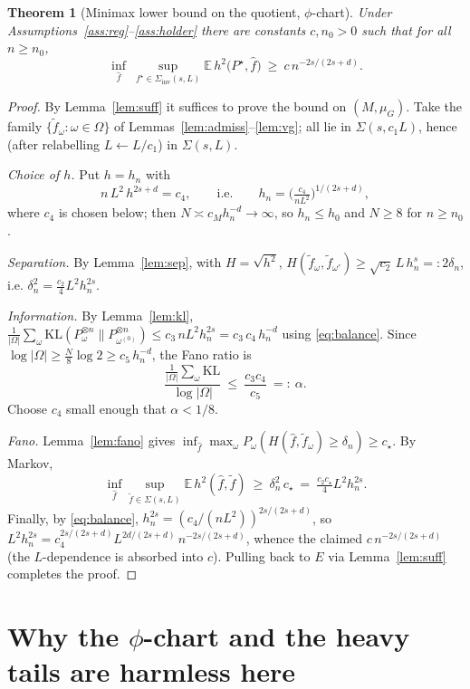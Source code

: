 \documentclass[11pt]{article}
\theoremstyle{plain}
\newtheorem{theorem}{Theorem}[section]
\theoremstyle{definition}
\theoremstyle{remark}
\newcommand{\E}{\mathbb{E}}
\newcommand{\KL}{\mathrm{KL}}
\begin{document}
\begin{theorem}[Minimax lower bound on the quotient, $\phi$-chart]\label{thm:lower}
Under Assumptions~\ref{ass:reg}--\ref{ass:holder} there are constants
$c,n_0>0$ such that for all $n\ge n_0$,
\[
\inf_{\widehat f}\ \sup_{f^\star\in\Sigma_{\mathrm{inv}}(s,L)}
\E\,h^2\big(P^\star,\widehat f\big)\ \ge\ c\,n^{-2s/(2s+d)} .
\]
\end{theorem}

\begin{proof}
By Lemma~\ref{lem:suff} it suffices to prove the bound on $(M,\mu_G)$. Take the
family $\{\tilde f_\omega:\omega\in\Omega\}$ of Lemmas~\ref{lem:admiss}--\ref{lem:vg};
all lie in $\Sigma(s,c_1L)$, hence (after relabelling $L\leftarrow L/c_1$) in
$\Sigma(s,L)$.

\emph{Choice of $h$.} Put $h=h_n$ with
\begin{equation}\label{eq:balance}
n\,L^2\,h^{2s+d}=c_4,\qquad\text{i.e.}\qquad h_n=\Big(\tfrac{c_4}{nL^2}\Big)^{1/(2s+d)},
\end{equation}
where $c_4$ is chosen below; then $N\asymp c_Mh_n^{-d}\to\infty$, so $h_n\le h_0$
and $N\ge8$ for $n\ge n_0$.

\emph{Separation.} By Lemma~\ref{lem:sep}, with $H=\sqrt{h^2}$,
$H(\tilde f_\omega,\tilde f_{\omega'})\ge\sqrt{c_2}\,L\,h_n^{s}=:2\delta_n$, i.e.
$\delta_n^2=\tfrac{c_2}{4}L^2h_n^{2s}$.

\emph{Information.} By Lemma~\ref{lem:kl},
$\frac1{|\Omega|}\sum_{\omega}\KL(P_\omega^{\otimes n}\|P_{\omega^{(0)}}^{\otimes n})
\le c_3\,nL^2h_n^{2s}=c_3\,c_4\,h_n^{-d}$ using \eqref{eq:balance}. Since
$\log|\Omega|\ge\frac{N}{8}\log2\ge c_5\,h_n^{-d}$, the Fano ratio is
\[
\frac{\frac1{|\Omega|}\sum_\omega\KL}{\log|\Omega|}\ \le\ \frac{c_3c_4}{c_5}\ =:\ \alpha .
\]
Choose $c_4$ small enough that $\alpha<1/8$.

\emph{Fano.} Lemma~\ref{lem:fano} gives
$\inf_{\widehat f}\max_\omega P_\omega(H(\widehat f,\tilde f_\omega)\ge\delta_n)\ge c_\star$.
By Markov,
\[
\inf_{\widehat f}\sup_{\tilde f\in\Sigma(s,L)}\E\,h^2(\widehat f,\tilde f)
\ \ge\ \delta_n^2\, c_\star
\ =\ \tfrac{c_2 c_\star}{4}L^2 h_n^{2s} .
\]
Finally, by \eqref{eq:balance}, $h_n^{2s}=(c_4/(nL^2))^{2s/(2s+d)}$, so
$L^2h_n^{2s}=c_4^{2s/(2s+d)}L^{2d/(2s+d)}\,n^{-2s/(2s+d)}$, whence the claimed
$c\,n^{-2s/(2s+d)}$ (the $L$-dependence is absorbed into $c$). Pulling back to
$E$ via Lemma~\ref{lem:suff} completes the proof.
\end{proof}

\section{Why the $\phi$-chart and the heavy tails are harmless here}
\end{document}
